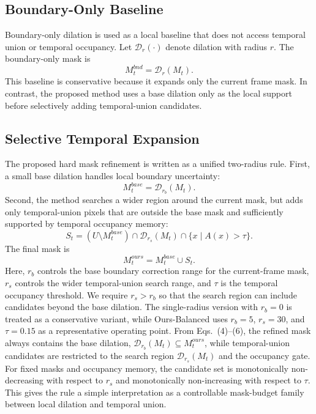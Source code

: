 \documentclass[nouppercase]{kaia}
\begin{document}
\subsection{Boundary-Only Baseline}
Boundary-only dilation is used as a local baseline that does not access temporal union or temporal occupancy. Let $\mathcal{D}_r(\cdot)$ denote dilation with radius $r$. The boundary-only mask is
\begin{equation}
    M_t^{bnd} = \mathcal{D}_r(M_t).
\end{equation}
This baseline is conservative because it expands only the current frame mask. In contrast, the proposed method uses a base dilation only as the local support before selectively adding temporal-union candidates.

\subsection{Selective Temporal Expansion}
The proposed hard mask refinement is written as a unified two-radius rule. First, a small base dilation handles local boundary uncertainty:
\begin{equation}
    M_t^{base} = \mathcal{D}_{r_b}(M_t).
\end{equation}
Second, the method searches a wider region around the current mask, but adds only temporal-union pixels that are outside the base mask and sufficiently supported by temporal occupancy memory:
\begin{equation}
    S_t =
    (U \setminus M_t^{base})
    \cap \mathcal{D}_{r_s}(M_t)
    \cap \{x \mid A(x) > \tau\}.
\end{equation}
The final mask is
\begin{equation}
    M_t^{ours} = M_t^{base} \cup S_t.
\end{equation}
Here, $r_b$ controls the base boundary correction range for the current-frame mask, $r_s$ controls the wider temporal-union search range, and $\tau$ is the temporal occupancy threshold. We require $r_s>r_b$ so that the search region can include candidates beyond the base dilation. The single-radius version with $r_b=0$ is treated as a conservative variant, while Ours-Balanced uses $r_b=5$, $r_s=30$, and $\tau=0.15$ as a representative operating point. From Eqs.~(4)--(6), the refined mask always contains the base dilation, $\mathcal{D}_{r_b}(M_t) \subseteq M_t^{ours}$, while temporal-union candidates are restricted to the search region $\mathcal{D}_{r_s}(M_t)$ and the occupancy gate. For fixed masks and occupancy memory, the candidate set is monotonically non-decreasing with respect to $r_s$ and monotonically non-increasing with respect to $\tau$. This gives the rule a simple interpretation as a controllable mask-budget family between local dilation and temporal union.
\end{document}
